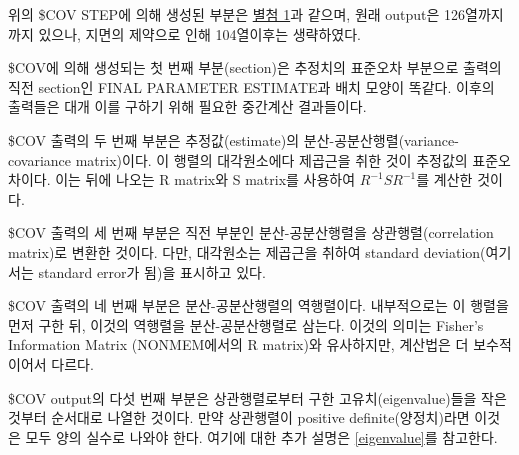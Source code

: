 \documentclass[
  11pt,
  krantz2, a4paper, twoside]{krantz}
\theoremstyle{definition}
\theoremstyle{definition}
\theoremstyle{definition}
\theoremstyle{remark}
\begin{document}
위의 \$COV STEP에 의해 생성된 부분은 \protect\hyperlink{nonmem-output-file}{별첨 1}과 같으며, 원래 output은 126열까지까지 있으나, 지면의 제약으로 인해 104열이후는 생략하였다.

\$COV에 의해 생성되는 첫 번째 부분(section)은 추정치의 표준오차 부분으로 출력의 직전 section인 FINAL PARAMETER ESTIMATE과 배치 모양이 똑같다. 이후의 출력들은 대개 이를 구하기 위해 필요한 중간계산 결과들이다.

\$COV 출력의 두 번째 부분은 추정값(estimate)의 분산-공분산행렬(variance-covariance matrix)이다. 이 행렬의 대각원소에다 제곱근을 취한 것이 추정값의 표준오차이다. 이는 뒤에 나오는 R matrix와 S matrix를 사용하여 \(R^{- 1}SR^{- 1}\)를 계산한 것이다.

\$COV 출력의 세 번째 부분은 직전 부분인 분산-공분산행렬을 상관행렬(correlation matrix)로 변환한 것이다. 다만, 대각원소는 제곱근을 취하여 standard deviation(여기서는 standard error가 됨)을 표시하고 있다.

\$COV 출력의 네 번째 부분은 분산-공분산행렬의 역행렬이다. 내부적으로는 이 행렬을 먼저 구한 뒤, 이것의 역행렬을 분산-공분산행렬로 삼는다. 이것의 의미는 Fisher's Information Matrix (NONMEM에서의 R matrix)와 유사하지만, 계산법은 더 보수적이어서 다르다.

\$COV output의 다섯 번째 부분은 상관행렬로부터 구한 고유치(eigenvalue)들을 작은 것부터 순서대로 나열한 것이다. 만약 상관행렬이 positive definite(양정치)라면 이것은 모두 양의 실수로 나와야 한다. 여기에 대한 추가 설명은 \ref{eigenvalue}를 참고한다.
\end{document}
